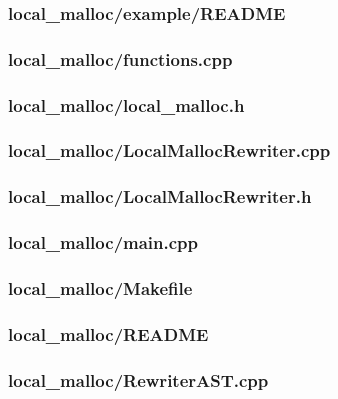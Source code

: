\documentclass{article}
\begin{document}
\subsubsection*{local\_malloc/example/README}


\subsubsection*{local\_malloc/functions.cpp}


\subsubsection*{local\_malloc/local\_malloc.h}


\subsubsection*{local\_malloc/LocalMallocRewriter.cpp}


\subsubsection*{local\_malloc/LocalMallocRewriter.h}


\subsubsection*{local\_malloc/main.cpp}


\subsubsection*{local\_malloc/Makefile}


\subsubsection*{local\_malloc/README}


\subsubsection*{local\_malloc/RewriterAST.cpp}

\end{document}
